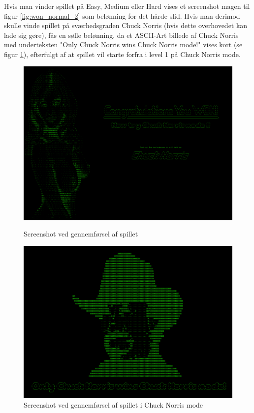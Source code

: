 Hvis man vinder spillet på Easy, Medium eller Hard vises et screenshot magen til figur \ref{fig:won_normal_2} som belønning for det hårde slid. Hvis man derimod skulle vinde spillet på sværhedsgraden Chuck Norris (hvis dette overhovedet kan lade sig gøre), fås en sølle belønning, da et ASCII-Art billede af Chuck Norris med underteksten "Only Chuck Norris wins Chuck Norris mode!" vises kort (se figur \ref{fig:won_chuck}), efterfulgt af at spillet vil starte forfra i level 1 på Chuck Norris mode.\\

\begin{figure}[H]
\begin{minipage}[b]{0.49\textwidth}
\includegraphics[width=\linewidth]{figs/screenshots/won_normal.png}
\caption{Screenshot ved gennemførsel af spillet}
\label{fig:won_normal_2}
\end{minipage}\hfill
\begin{minipage}[b]{0.49\textwidth}
\includegraphics[width=\linewidth]{figs/screenshots/won_chuck_crop.png}
\caption{Screenshot ved gennemførsel af spillet i Chuck Norris mode}
\label{fig:won_chuck}
\end{minipage}\hfill
\end{figure}